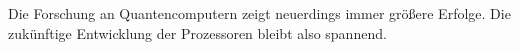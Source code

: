\documentclass[a4paper,12pt]{article}
\begin{document}
\par\bigskip\noindent Die Forschung an Quantencomputern zeigt neuerdings immer größere Erfolge. Die zukünftige Entwicklung der Prozessoren bleibt also spannend. 
\newpage
\pagestyle{empty}

\listoffigures
\newpage
{}
\listoftables
\newpage
{}
\listofcodes
\newpage
{}

\end{document}
